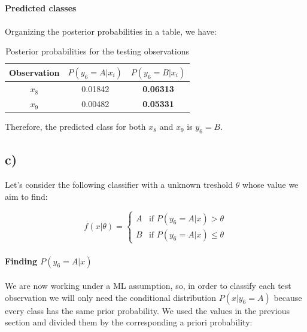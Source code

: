 \documentclass{article}
\begin{document}
\paragraph{Predicted classes}
\paragraph{}

Organizing the posterior probabilities in a table, we have:

\begin{table}[H]
\centering
\begin{tabular}{|c|c|c|}
\hline
Observation & $P(y_6=A|x_i)$ & $P(y_6=B|x_i)$ \\ \hline
$x_8$       & 0.01842         & \textbf{0.06313}        \\ \hline
$x_9$       & 0.00482         & \textbf{0.05331}        \\ \hline
\end{tabular}
\label{tab:posterior_probabilities}
\caption{Posterior probabilities for the testing observations}
\end{table}

Therefore, the predicted class for both $x_8$ and $x_9$ is $y_6=B$.

\subsection*{c)}

Let's consider the following classifier with a unknown treshold $\theta$ whose value we aim to find:

\[
  f(x|\theta) = \begin{cases}
    A & \text{if } P(y_6=A|x) > \theta \\
    B & \text{if } P(y_6=A|x) \leq \theta
  \end{cases}
\]

\paragraph{Finding $P(y_6=A|x)$}
\paragraph{}

We are now working under a ML assumption, so, in order to classify each test observation we will only need the conditional distribution $P(x|y_6=A)$ because every class has the same prior probability.
We used the values in the previous section and divided them by the corresponding a priori probability:
\end{document}
